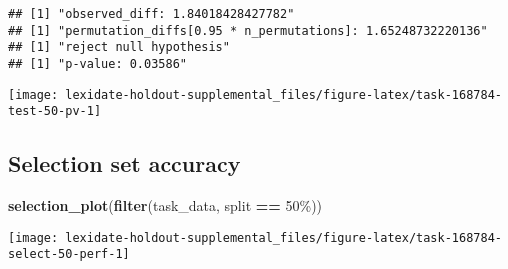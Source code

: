 \documentclass[
]{book}
\newenvironment{Shaded}{\begin{snugshade}}{\end{snugshade}}
\newcommand{\AttributeTok}[1]{\textcolor[rgb]{0.13,0.29,0.53}{#1}}
\newcommand{\DecValTok}[1]{\textcolor[rgb]{0.00,0.00,0.81}{#1}}
\newcommand{\FunctionTok}[1]{\textcolor[rgb]{0.13,0.29,0.53}{\textbf{#1}}}
\newcommand{\NormalTok}[1]{#1}
\newcommand{\OtherTok}[1]{\textcolor[rgb]{0.56,0.35,0.01}{#1}}
\newcommand{\SpecialCharTok}[1]{\textcolor[rgb]{0.81,0.36,0.00}{\textbf{#1}}}
\newcommand{\StringTok}[1]{\textcolor[rgb]{0.31,0.60,0.02}{#1}}
\begin{document}
\begin{Shaded}
\end{Shaded}

\begin{verbatim}
## [1] "observed_diff: 1.84018428427782"
## [1] "permutation_diffs[0.95 * n_permutations]: 1.65248732220136"
## [1] "reject null hypothesis"
## [1] "p-value: 0.03586"
\end{verbatim}

\texttt{[image: lexidate-holdout-supplemental\_files/figure-latex/task-168784-test-50-pv-1]}

\hypertarget{selection-set-accuracy-52}{%
\subsection{Selection set accuracy}\label{selection-set-accuracy-52}}

\begin{Shaded}
\begin{Highlighting}[]
\FunctionTok{selection\_plot}\NormalTok{(}\FunctionTok{filter}\NormalTok{(task\_data, split }\SpecialCharTok{==} \StringTok{\textquotesingle{}50\%\textquotesingle{}}\NormalTok{))}
\end{Highlighting}
\end{Shaded}

\texttt{[image: lexidate-holdout-supplemental\_files/figure-latex/task-168784-select-50-perf-1]}
\end{document}
